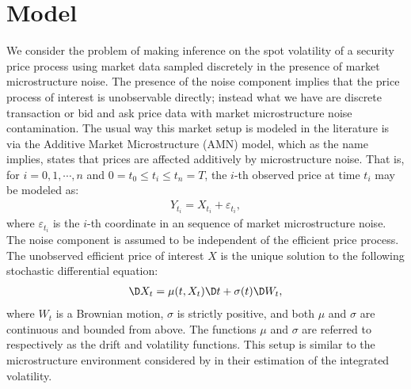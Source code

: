 \section{Model}\label{sec:model2}
We consider the problem of making inference on the spot volatility of a  security price process using market data sampled discretely in the presence of market microstructure noise. The presence of the noise component implies that  the  price process of interest is unobservable directly; instead what we have  are discrete transaction or bid and ask price data  with market microstructure noise contamination. The usual way this market setup is modeled in the literature is via the Additive Market Microstructure (AMN) model, which as the name implies, states that prices are affected additively by microstructure noise. That is, for $i = 0,1,\cdots,n$  and $0 = t_0\le t_i \le t_n = T$,  the $i$-th observed price at time $t_i$  may be modeled as:
\begin{align}
  Y_{t_i} = X_{t_i} + \varepsilon_{t_i},
  \label{}
\end{align}
 where $\varepsilon_{t_i}$ is the $i$-th coordinate in an  \iid sequence of market microstructure noise. The noise component is assumed to be independent of the efficient price process. The unobserved efficient price of interest $X$  is the unique solution to the following stochastic differential equation:
\begin{align}
  \D X_t = \mu(t,X_t) \D t + \sigma(t) \D W_t, 
  \label{eq:sde}
\end{align}
where $W_t$ is a Brownian motion, $\sigma $ is strictly positive, and both $\mu$ and $\sigma$ are  continuous and bounded from above. The functions $\mu$ and $\sigma$ are referred to respectively as the drift and volatility functions.  This setup is similar to the  microstructure environment considered by \cite{Zhang2005} in their estimation of the integrated volatility. 
